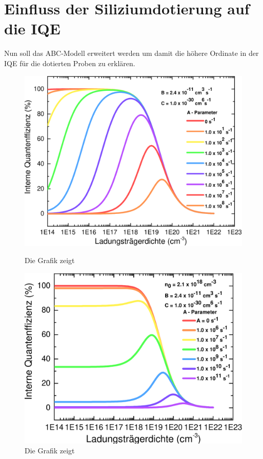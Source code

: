 \section{Einfluss der Siliziumdotierung auf die IQE}
Nun soll das ABC-Modell erweitert werden um damit die höhere Ordinate in der IQE für die dotierten Proben zu erklären.
%
\begin{figure}[H]
    \centering
    \begin{minipage}[t]{0.49\linewidth}
        \centering
        \includegraphics[width=\linewidth]{Bilder/IQEohneDotierungVerschAParams.pdf}
        \caption{Die Grafik zeigt}
        \label{fig:iqenorm}
    \end{minipage}%
    \hfill
    \begin{minipage}[t]{0.49\linewidth}
        \centering
        \includegraphics[width=\linewidth]{Bilder/IQEmitDotierungVerschAParams.pdf}
        \caption{Die Grafik zeigt  }
        \label{fig:iqedot}
    \end{minipage}
\end{figure}
